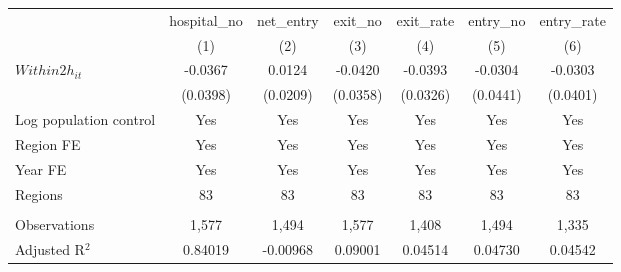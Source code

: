 \begingroup
\centering
\begin{tabular}{lcccccc}
   \toprule
                          & hospital\_no  & net\_entry  & exit\_no  & exit\_rate  & entry\_no  & entry\_rate \\    
                          & (1)           & (2)         & (3)       & (4)         & (5)        & (6)\\  
   \midrule 
   $Within2h_{it}$        & -0.0367       & 0.0124      & -0.0420   & -0.0393     & -0.0304    & -0.0303\\   
                          & (0.0398)      & (0.0209)    & (0.0358)  & (0.0326)    & (0.0441)   & (0.0401)\\   
   Log population control & Yes           & Yes         & Yes       & Yes         & Yes        & Yes\\  
   Region FE              & Yes           & Yes         & Yes       & Yes         & Yes        & Yes\\  
   Year FE                & Yes           & Yes         & Yes       & Yes         & Yes        & Yes\\  
   Regions                & 83            & 83          & 83        & 83          & 83         & 83\\  
    \\
   Observations           & 1,577         & 1,494       & 1,577     & 1,408       & 1,494      & 1,335\\  
   Adjusted R$^2$         & 0.84019       & -0.00968    & 0.09001   & 0.04514     & 0.04730    & 0.04542\\  
   \bottomrule
\end{tabular}
\par\endgroup
